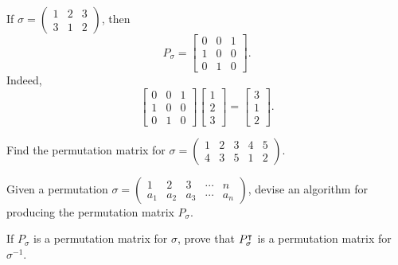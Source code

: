 \documentclass{ximera}
\begin{document}
\begin{example}
  If $\sigma =\left(\begin{smallmatrix}
    1 & 2 & 3 \\
    3 & 1 & 2
  \end{smallmatrix}\right)$, then
  \[
  P_\sigma =
  \begin{bmatrix}
    0 & 0 & 1 \\
    1 & 0 & 0 \\
    0  & 1 & 0
  \end{bmatrix}.
  \]
  Indeed,
  \[
  \begin{bmatrix}
    0 & 0 & 1 \\
    1 & 0 & 0 \\
    0  & 1 & 0
  \end{bmatrix}
  \begin{bmatrix}
    1 \\
    2 \\
    3
  \end{bmatrix}
  =
  \begin{bmatrix}
    3 \\
    1 \\
    2
  \end{bmatrix}.
  \]
\end{example}


\begin{exercise}
  Find the permutation matrix for $\sigma = \left(\begin{smallmatrix}
    1 & 2 & 3 & 4 & 5\\
    4 & 3 & 5 & 1 & 2
  \end{smallmatrix}\right)$.
\end{exercise}


\begin{exercise}
  Given a permutation $\sigma = \left(\begin{smallmatrix}
    1 & 2 & 3 & \cdots & n\\
    a_1 & a_2 & a_3 & \cdots & a_n
  \end{smallmatrix}\right)$, devise an algorithm for producing the permutation matrix $P_{\sigma}$.
\end{exercise}

\begin{exercise}
  If $P_\sigma$ is a permutation matrix for $\sigma$, prove that
  $P_\sigma^\intercal$ is a permutation matrix for $\sigma^{-1}$.
\end{exercise}
\end{document}
